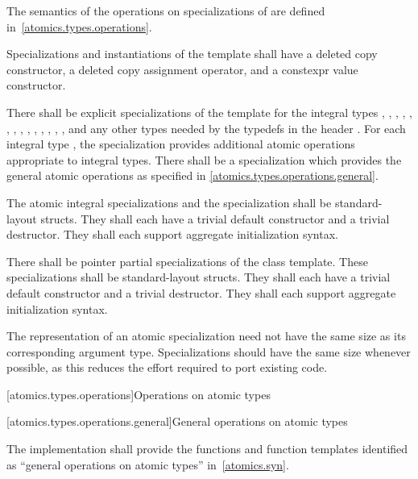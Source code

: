 \pnum
The semantics of the operations on specializations of  are defined
in~\ref{atomics.types.operations}.

\pnum
Specializations and instantiations of the  template shall have a deleted copy constructor, a deleted
copy assignment operator, and a constexpr value constructor.

%
\pnum
There shall be explicit specializations of the 
template for the integral types
,
,
,
,
,
,
,
,
,
,
,
,
,
,
and any other types needed by the typedefs in the header .
For each integral type , the specialization
 provides additional atomic operations appropriate to integral types.
There shall be a specialization  which provides the general
atomic operations as specified in \ref{atomics.types.operations.general}.

\pnum
The atomic integral specializations and the specialization 
shall be standard-layout structs. They shall each have a trivial default constructor
and a trivial destructor. They shall each support aggregate initialization
syntax.

%
\pnum
There shall be pointer partial specializations of the  class template.
These specializations shall be standard-layout structs.
They shall each have a trivial default constructor and a trivial destructor.
They shall each support aggregate initialization syntax.

\pnum
\begin{note} The representation of an atomic specialization need not have the same size as its
corresponding argument type. Specializations should have the same size whenever possible, as
this reduces the effort required to port existing code. \end{note}

[atomics.types.operations]{Operations on atomic types}

[atomics.types.operations.general]{General operations on atomic types}

\pnum
The implementation shall provide the functions and function templates identified as ``general operations
on atomic types'' in~\ref{atomics.syn}.

